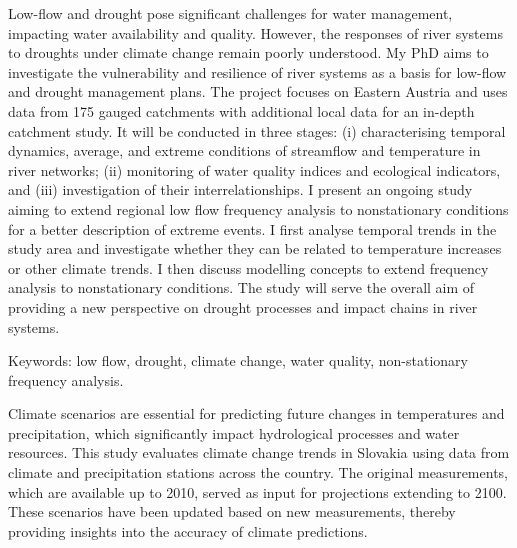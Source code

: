 Low-flow and drought pose significant challenges for water management, impacting water availability and quality. However, the responses of river systems to droughts under climate change remain poorly understood. My PhD aims to investigate the vulnerability and resilience of river systems as a basis for low-flow and drought management plans. The project focuses on Eastern Austria and uses data from 175 gauged catchments with additional local data for an in-depth catchment study. It will be conducted in three stages: (i) characterising temporal dynamics, average, and extreme conditions of streamflow and temperature in river networks; (ii) monitoring of water quality indices and ecological indicators, and (iii) investigation of their interrelationships. I present an ongoing study aiming to extend regional low flow frequency analysis to nonstationary conditions for a better description of extreme events. I first analyse temporal trends in the study area and investigate whether they can be related to temperature increases or other climate trends. I then discuss modelling concepts to extend frequency analysis to nonstationary conditions. The study will serve the overall aim of providing a new perspective on drought processes and impact chains in river systems.

Keywords: low flow, drought, climate change, water quality, non-stationary frequency analysis.

\newpage{}
{}
\begin{flushleft}





\end{flushleft}

\noindent

Climate scenarios are essential for predicting future changes in temperatures and precipitation, which significantly impact hydrological processes and water resources. This study evaluates climate change trends in Slovakia using data from climate and precipitation stations across the country. The original measurements, which are available up to 2010, served as input for projections extending to 2100. These scenarios have been updated based on new measurements, thereby providing insights into the accuracy of climate predictions.

